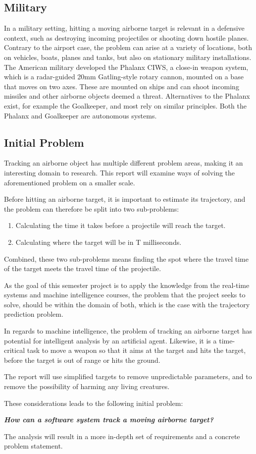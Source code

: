 \subsection{Military}
In a military setting, hitting a moving airborne target is relevant in a defensive context, such as destroying incoming projectiles or shooting down hostile planes.
Contrary to the airport case, the problem can arise at a variety of locations, both on vehicles, boats, planes and tanks, but also on stationary military installations.
The American military developed the Phalanx CIWS, a close-in weapon system, which is a radar-guided 20mm Gatling-style rotary cannon, mounted on a base that moves on two axes.
These are mounted on ships and can shoot incoming missiles and other airborne objects deemed a threat.
Alternatives to the Phalanx exist, for example the Goalkeeper, and most rely on similar principles.
Both the Phalanx and Goalkeeper are autonomous systems.

\subsection{Initial Problem}
Tracking an airborne object has multiple different problem areas, making it an interesting domain to research.
This report will examine ways of solving the aforementioned problem on a smaller scale.

Before hitting an airborne target, it is important to estimate its trajectory, and the problem can therefore be split into two sub-problems:
\begin{enumerate}
  \item Calculating the time it takes before a projectile will reach the target.
  \item Calculating where the target will be in T milliseconds.
\end{enumerate}
Combined, these two sub-problems means finding the spot where the travel time of the target meets the travel time of the projectile.

As the goal of this semester project is to apply the knowledge from the real-time systems and machine intelligence courses, the problem that the project seeks to solve, should be within the domain of both, which is the case with the trajectory prediction problem.

In regards to machine intelligence, the problem of tracking an airborne target has potential for intelligent analysis by an artificial agent.
Likewise, it is a time-critical task to move a weapon so that it aims at the target and hits the target, before the target is out of range or hits the ground.

The report will use simplified targets to remove unpredictable parameters, and to remove the possibility of harming any living creatures.

These considerations leads to the following initial problem:
\label{key:initialProblem}
\begin{center}
  \textit{\textbf{How can a software system track a moving airborne target?}}
\end{center}
The analysis will result in a more in-depth set of requirements and a concrete problem statement.
